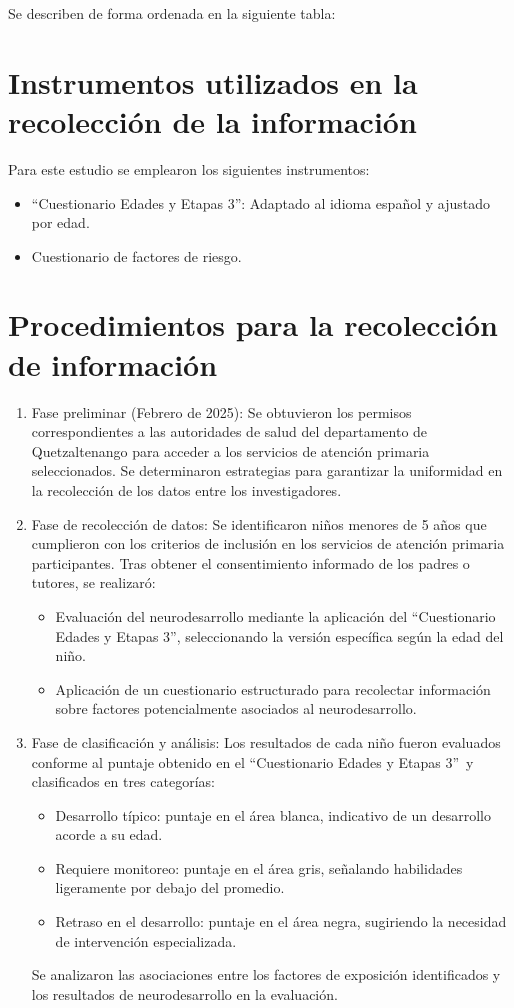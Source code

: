 \documentclass[11pt,letterpaper]{report}
\newcommand{\asq}{“Cuestionario Edades y Etapas 3”}
\begin{document}
Se describen de forma ordenada en la siguiente tabla:



\section{Instrumentos utilizados en la recolección de la información}
Para este estudio se emplearon los siguientes instrumentos:
		\begin{itemize}
		\item \asq: Adaptado al idioma español y ajustado por edad.	
		\item Cuestionario de factores de riesgo.
		\end{itemize}

\section{Procedimientos para la recolección de información}
	\begin{enumerate}
		\item Fase preliminar (Febrero de 2025):
		Se obtuvieron los permisos correspondientes a las autoridades de salud
		del departamento de Quetzaltenango para acceder a los servicios de
		atención primaria seleccionados. Se determinaron estrategias para
		garantizar la uniformidad en la recolección de los datos entre los
		investigadores.
		\item Fase de recolección de datos:
		Se identificaron niños menores de 5 años que cumplieron con los
		criterios de inclusión en los servicios de atención primaria
		participantes. Tras obtener el consentimiento informado de los padres o
		tutores, se realizaró:
			\begin{itemize}
			\item Evaluación del neurodesarrollo mediante la aplicación del
			\asq, seleccionando la versión específica según la edad del niño.
			\item Aplicación de un cuestionario estructurado para recolectar
			información sobre factores potencialmente asociados al
			neurodesarrollo.
			\end{itemize}
		\item Fase de clasificación y análisis:
		Los resultados de cada niño fueron evaluados conforme al puntaje
		obtenido en el \asq\ y clasificados en tres categorías:
			\begin{itemize}
			\item Desarrollo típico: puntaje en el área blanca, indicativo de
			un desarrollo acorde a su edad.
			\item Requiere monitoreo: puntaje en el área gris, señalando
			habilidades ligeramente por debajo del promedio.
			\item Retraso en el desarrollo: puntaje en el área negra,
			sugiriendo la necesidad de intervención especializada.
			\end{itemize}
		Se analizaron las asociaciones entre los factores de exposición
		identificados y los resultados de neurodesarrollo en la evaluación.
	\end{enumerate}
\end{document}
